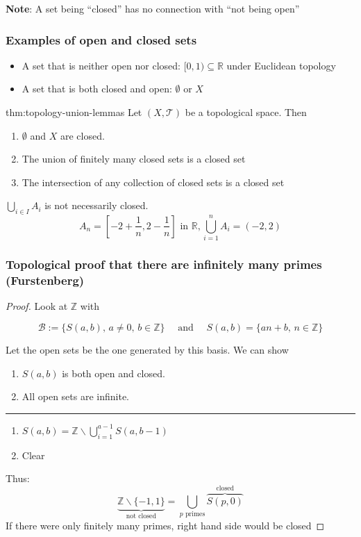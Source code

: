 \documentclass{article}
\begin{document}
\textbf{Note}: A set being ``closed'' has no connection with ``not being open''

\subsubsection{Examples of open and closed sets}
\begin{itemize}
    \item A set that is neither open nor closed: $[0, 1) \subseteq \mathbb{R}$ under Euclidean topology
    \item A set that is both closed and open: $\emptyset$ or $X$
\end{itemize}

\begin{thm}[]{thm:topology-union-lemmas}{}
    Let $(X, \mathcal{T})$ be a topological space. Then
    \begin{enumerate}
        \item $\emptyset$ and $X$ are closed.
        \item The union of finitely many closed sets is a closed set
        \item The intersection of any collection of closed sets is a closed set
    \end{enumerate}
\end{thm}

$\bigcup_{i\in I} A_{i}$ is not necessarily closed.
\[A_{n} = \left[-2 + \frac{1}{n}, 2 - \frac{1}{n}\right] \text{ in } \mathbb{R}, \bigcup_{i = 1}^{n} A_{i} = (-2, 2)\]

\subsubsection{Topological proof that there are infinitely many primes (Furstenberg)}
\begin{proof}
    Look at $\mathbb{Z}$ with

    \[\mathcal{B} := \{S(a, b),\, a\ne 0,\,b\in \mathbb{Z}\} \quad\text{ and }\quad S(a,b) = \{an + b,\,n\in \mathbb{Z}\}\]

    Let the open sets be the one generated by this basis. We can show
    \begin{enumerate}
        \item $S(a,b)$ is both open and closed.
        \item All open sets are infinite.
    \end{enumerate}

    \vspace{-3pt}
    \noindent\rule{\textwidth}{0.08ex}\vspace{-8pt}

    \begin{enumerate}
        \item $S(a,b) = \mathbb{Z} \backslash \bigcup_{i=1}^{a - 1} S(a, b-1)$
        \item Clear
    \end{enumerate}

    Thus:
    \[\underbrace{\mathbb{Z} \backslash \{-1, 1\}}_{\text{not closed}} = \bigcup_{\text{$p$ primes}} \overbrace{S(p, 0)}^{\text{closed}}\]
    If there were only finitely many primes, right hand side would be closed
\end{proof}
\end{document}
